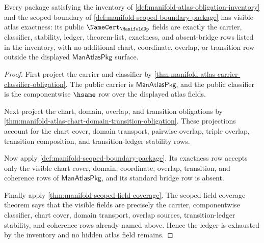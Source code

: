 \begin{theorem}
\label{thm:manifold-atlas-namecert-exactness-obligation}
Every package satisfying the inventory of
\autoref{def:manifold-atlas-obligation-inventory} and the scoped boundary of
\autoref{def:manifold-scoped-boundary-package} has visible-atlas exactness:
its public $\NameCert_{\ManifoldUp}$ fields are exactly the carrier,
classifier, stability, ledger, theorem-list, exactness, and absent-bridge rows
listed in the inventory, with no additional chart, coordinate, overlap, or
transition row outside the displayed $\mathsf{ManAtlasPkg}$ surface.
\end{theorem}
\begin{proof}
First project the carrier and classifier by
\autoref{thm:manifold-atlas-carrier-classifier-obligation}. The public carrier
is $\mathsf{ManAtlasPkg}$, and the public classifier is the componentwise
$\hsame$ row over the displayed atlas fields.

Next project the chart, domain, overlap, and transition obligations by
\autoref{thm:manifold-atlas-chart-domain-transition-obligation}. These
projections account for the chart cover, domain transport, pairwise overlap,
triple overlap, transition composition, and transition-ledger stability rows.

Now apply \autoref{def:manifold-scoped-boundary-package}. Its exactness row
accepts only the visible chart cover, domain, coordinate, overlap, transition,
and coherence rows of $\mathsf{ManAtlasPkg}$, and its standard bridge row is
absent.

Finally apply \autoref{thm:manifold-scoped-field-coverage}. The scoped field
coverage theorem says that the visible fields are precisely the carrier,
componentwise classifier, chart cover, domain transport, overlap sources,
transition-ledger stability, and coherence rows already named above. Hence the
ledger is exhausted by the inventory and no hidden atlas field remains.
\end{proof}
